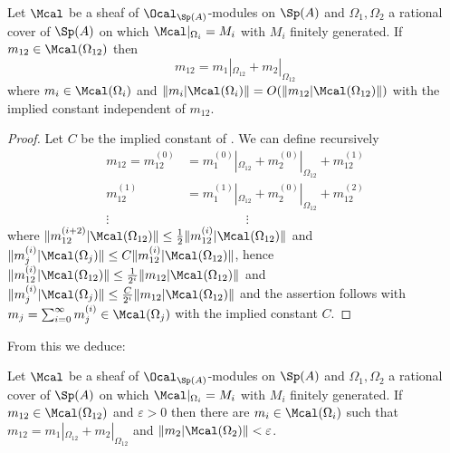 \begin{lemma}\label{lem: module element decomposition}
    Let $\Mcal$ be a sheaf of $\Ocal_{\Sp(A)}$-modules on $\Sp(A)$ and $\Omega_{1},\Omega_{2}$ a rational cover of $\Sp(A)$ on which $\Mcal|_{\Omega_{i}}=M_{i}$ with $M_{i}$ finitely generated. If $m_{12}\in \Mcal(\Omega_{12})$ then 
    $$m_{12}=m_{1}|_{\Omega_{12}}+m_{2}|_{\Omega_{12}}$$
    where $m_{i}\in\Mcal(\Omega_{i})$ and $\Vert m_{i}|\Mcal(\Omega_{i})\Vert=O(\Vert m_{12}|\Mcal(\Omega_{12})\Vert)$ with the implied constant independent of $m_{12}$. 
\end{lemma}
\begin{proof}
    Let $C$ be the implied constant of . We can define recursively 
    \begin{align*}
        m_{12} = m_{12}^{(0)} &= m_{1}^{(0)}|_{\Omega_{12}}+m_{2}^{(0)}|_{\Omega_{12}}+m_{12}^{(1)} \\
        m_{12}^{(1)} &= m_{1}^{(1)}|_{\Omega_{12}} + m_{2}^{(0)}|_{\Omega_{12}} + m_{12}^{(2)} \\
        \vdots &\hspace{2cm}\vdots
    \end{align*}
    where $\Vert m_{12}^{(i+2)}|\Mcal(\Omega_{12})\Vert\leq\frac{1}{2}\Vert m_{12}^{(i)}|\Mcal(\Omega_{12})\Vert$ and $\Vert m_{j}^{(i)}|\Mcal(\Omega_{j})\Vert\leq C\Vert m_{12}^{(i)}|\Mcal(\Omega_{12})\Vert$, hence $\Vert m_{12}^{(i)}|\Mcal(\Omega_{12})\Vert\leq \frac{1}{2^{i}}\Vert m_{12}|\Mcal(\Omega_{12})\Vert$ and $\Vert m_{j}^{(i)}|\Mcal(\Omega_{j})\Vert\leq\frac{C}{2^{i}}\Vert m_{12}|\Mcal(\Omega_{12})\Vert$ and the assertion follows with $m_{j}=\sum_{i=0}^{\infty}m_{j}^{(i)}\in\Mcal(\Omega_{j})$ with the implied constant $C$. 
\end{proof}
From this we deduce: 
\begin{corollary}\label{corr: sum decomposition smaller than epsilon}
    Let $\Mcal$ be a sheaf of $\Ocal_{\Sp(A)}$-modules on $\Sp(A)$ and $\Omega_{1},\Omega_{2}$ a rational cover of $\Sp(A)$ on which $\Mcal|_{\Omega_{i}}=M_{i}$ with $M_{i}$ finitely generated. If $m_{12}\in\Mcal(\Omega_{12})$ and $\varepsilon>0$ then there are $m_{i}\in\Mcal(\Omega_{i})$ such that $m_{12}=m_{1}|_{\Omega_{12}}+m_{2}|_{\Omega_{12}}$ and $\Vert m_{2}|\Mcal(\Omega_{2})\Vert<\varepsilon$. 
\end{corollary}
